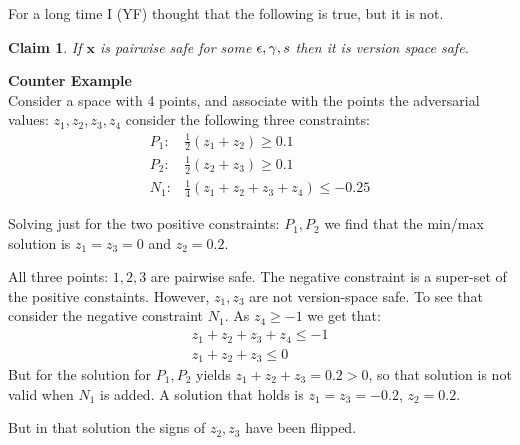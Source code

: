 \documentclass{article}
\newtheorem{claim}{Claim}[section]
\newcommand{\vx}{\mathbf{x}}
\begin{document}
For a long time I (YF) thought that the following is true, but it is not.
\begin{claim}
  If $\vx$ is pairwise safe for some $\epsilon,\gamma,s$ then it is version space safe. 
\end{claim}

{\bf Counter Example}\\
\noindent
Consider a space with 4 points, and associate with the points the
adversarial values: $z_1,z_2,z_3,z_4$ consider the following three
constraints:
\begin{eqnarray}
  P_1:& \frac{1}{2}(z_1+z_2) \geq 0.1\\
  P_2:& \frac{1}{2}(z_2+z_3) \geq 0.1\\
  N_1:& \frac{1}{4}(z_1+z_2+z_3+z_4) \leq -0.25
\end{eqnarray}

Solving just for the two positive constraints: $P_1,P_2$ we find that
the min/max solution is $z_1=z_3=0$ and $z_2=0.2$.

All three points: $1,2,3$ are pairwise safe. The negative constraint
is a super-set of the positive constaints. However, $z_1,z_3$ are not
version-space safe. To see that consider the negative constraint
$N_1$. As $z_4\geq -1$ we get that:
\begin{eqnarray*}
  z_1+z_2+z_3+z_4 \leq -1 \\
  z_1+z_2+z_3 \leq 0 
\end{eqnarray*}
But for the solution for $P_1,P_2$ yields $z_1+z_2+z_3=0.2>0$, so that
solution is not valid when $N_1$ is added. A solution that holds is
$z_1=z_3=-0.2$, $z_2=0.2$.

But in that solution the signs of $z_2,z_3$ have been flipped.
\end{document}
